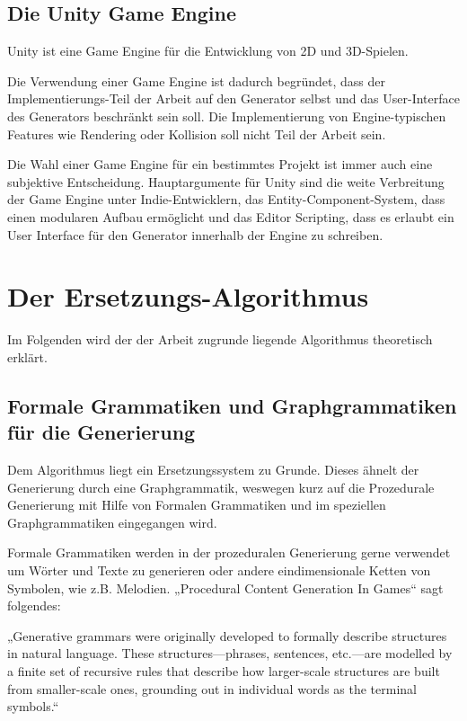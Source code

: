 \section{Die Unity Game Engine}

Unity ist eine Game Engine für die Entwicklung von 2D und 3D-Spielen. 

Die Verwendung einer Game Engine ist dadurch begründet, dass der Implementierungs-Teil der Arbeit auf den Generator selbst und das User-Interface des Generators beschränkt sein soll. Die Implementierung von Engine-typischen Features wie Rendering oder Kollision soll nicht Teil der Arbeit sein.

Die Wahl einer Game Engine für ein bestimmtes Projekt ist immer auch eine subjektive Entscheidung. Hauptargumente für Unity sind die weite Verbreitung der Game Engine unter Indie-Entwicklern, das Entity-Component-System, dass einen modularen Aufbau ermöglicht und das Editor Scripting, dass es erlaubt ein User Interface für den Generator innerhalb der Engine zu schreiben. 

\chapter{Der Ersetzungs-Algorithmus}

Im Folgenden wird der der Arbeit zugrunde liegende Algorithmus theoretisch erklärt.

\section{Formale Grammatiken und Graphgrammatiken für die Generierung}

Dem Algorithmus liegt ein Ersetzungssystem zu Grunde. Dieses ähnelt der Generierung durch eine Graphgrammatik, weswegen kurz auf die Prozedurale Generierung mit Hilfe von Formalen Grammatiken und im speziellen Graphgrammatiken eingegangen wird.

Formale Grammatiken werden in der prozeduralen Generierung gerne verwendet um Wörter und Texte zu generieren oder andere eindimensionale Ketten von Symbolen, wie z.B. Melodien. „Procedural Content Generation In Games“ sagt folgendes:

„Generative grammars were originally developed to formally describe structures in natural language. These structures—phrases, sentences, etc.—are modelled by a finite set of recursive rules that describe how larger-scale structures are built from smaller-scale ones, grounding out in individual words as the terminal symbols.“
\cite[Kap.~3.5, S.~45]{shaker2016procedural}


